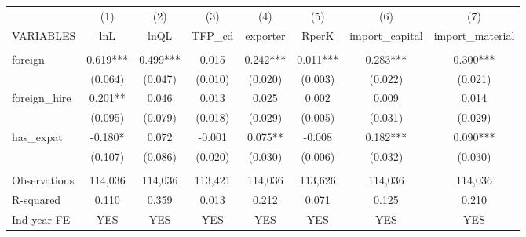\begin{tabular}{lccccccc} \hline
 & (1) & (2) & (3) & (4) & (5) & (6) & (7) \\
VARIABLES & lnL & lnQL & TFP\_cd & exporter & RperK & import\_capital & import\_material \\ \hline
 &  &  &  &  &  &  &  \\
foreign & 0.619*** & 0.499*** & 0.015 & 0.242*** & 0.011*** & 0.283*** & 0.300*** \\
 & (0.064) & (0.047) & (0.010) & (0.020) & (0.003) & (0.022) & (0.021) \\
foreign\_hire & 0.201** & 0.046 & 0.013 & 0.025 & 0.002 & 0.009 & 0.014 \\
 & (0.095) & (0.079) & (0.018) & (0.029) & (0.005) & (0.031) & (0.029) \\
has\_expat & -0.180* & 0.072 & -0.001 & 0.075** & -0.008 & 0.182*** & 0.090*** \\
 & (0.107) & (0.086) & (0.020) & (0.030) & (0.006) & (0.032) & (0.030) \\
 &  &  &  &  &  &  &  \\
Observations & 114,036 & 114,036 & 113,421 & 114,036 & 113,626 & 114,036 & 114,036 \\
R-squared & 0.110 & 0.359 & 0.013 & 0.212 & 0.071 & 0.125 & 0.210 \\
 Ind-year FE & YES & YES & YES & YES & YES & YES & YES \\ \hline
\end{tabular}
